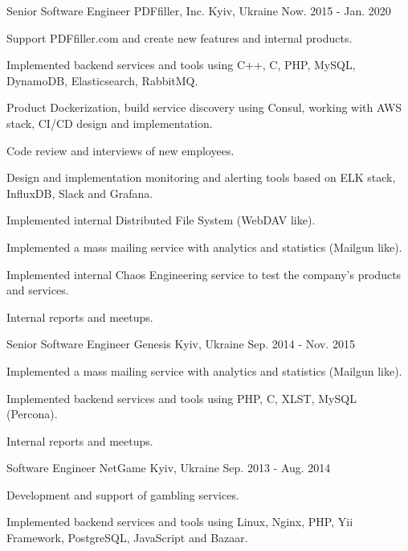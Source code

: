 \begin{cventries}
  \cventry
    {Senior Software Engineer}
    {PDFfiller, Inc.}
    {Kyiv, Ukraine}
    {Now. 2015 - Jan. 2020}
    {
      \begin{cvitems}
        \item {Support PDFfiller.com and create new features and internal products.}
        \item {Implemented backend services and tools using C++, C, PHP, MySQL, DynamoDB, Elasticsearch, RabbitMQ.}
        \item {Product Dockerization, build service discovery using Consul, working with AWS stack, CI/CD design and implementation.}
        \item {Code review and interviews of new employees.}
        \item {Design and implementation monitoring and alerting tools based on ELK stack, InfluxDB, Slack and Grafana.}
        \item {Implemented internal Distributed File System (WebDAV like).}
        \item {Implemented a mass mailing service with analytics and statistics (Mailgun like).}
        \item {Implemented internal Chaos Engineering service to test the company's products and services.}
        \item {Internal reports and meetups.}
      \end{cvitems}
    }

  \cventry
    {Senior Software Engineer}
    {Genesis}
    {Kyiv, Ukraine}
    {Sep. 2014 - Nov. 2015}
    {
      \begin{cvitems}
        \item {Implemented a mass mailing service with analytics and statistics (Mailgun like).}
        \item {Implemented backend services and tools using PHP, C, XLST, MySQL (Percona).}
        \item {Internal reports and meetups.}
      \end{cvitems}
    }

  \cventry
    {Software Engineer}
    {NetGame}
    {Kyiv, Ukraine}
    {Sep. 2013 - Aug. 2014}
    {
      \begin{cvitems}
        \item {Development and support of gambling services.}
        \item {Implemented backend services and tools using Linux, Nginx, PHP, Yii Framework, PostgreSQL, JavaScript and Bazaar.}
      \end{cvitems}
    }


\end{cventries}
